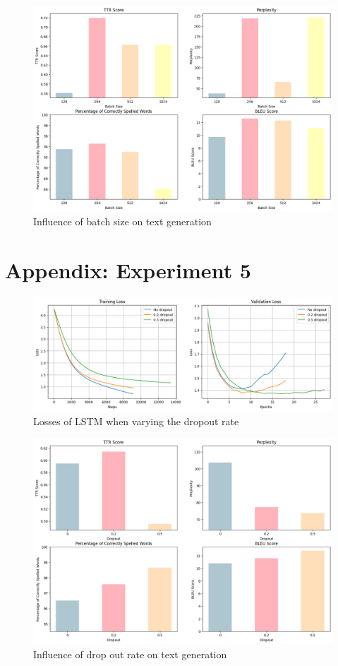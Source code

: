 \documentclass{article}
\begin{document}
\begin{figure}[H]
    \centering
    \includegraphics[width=0.8\linewidth]{figures/text_batch_size.png}
    \caption{Influence of batch size on text generation}
    \label{fig:text_batch}
\end{figure}


\section*{Appendix: Experiment 5}
\begin{figure}[H]
    \centering
    \includegraphics[width=\linewidth]{figures/LSTM_dropout.png}
    \caption{Losses of LSTM when varying the dropout rate}
    \label{fig:loss_dropout}
\end{figure}

\begin{figure}[H]
    \centering
    \includegraphics[width=0.8\linewidth]{figures/text_dropout.png}
    \caption{Influence of drop out rate on text generation}
    \label{fig:text_dropout}
\end{figure}
\end{document}
